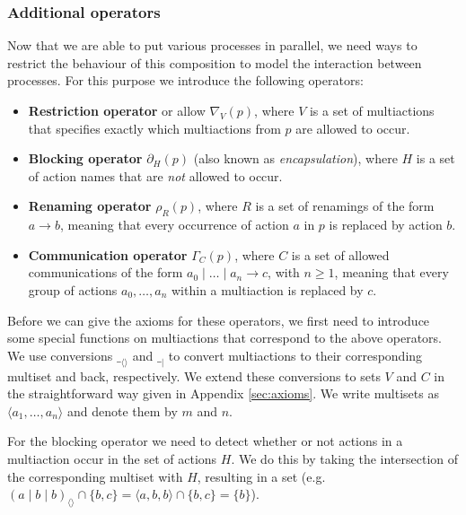 \documentclass[a4paper,fleqn]{article}
\newcommand{\set}[1]{\ensuremath{\{\,#1\,\}}}
\newcommand{\bag}[1]{\ensuremath{\set{#1}}}
\newcommand{\deffont}[1]{\textbf{#1}}
\newcommand{\sync}{\mathbin{\!\mid\!}}
\newcommand{\block}[1]{\partial_{#1}}
\newcommand{\ren}[1]{\rho_{#1}}
\newcommand{\allow}[1]{\nabla_{#1}}
\newcommand{\comm}[1]{\Gamma_{#1}}
\def\tobag#1{#1_{\langle\rangle}}
\def\tomact#1{#1_{\mid}}
\def\bag#1{\langle #1 \rangle}
\begin{document}
\subsubsection{Additional operators}
\label{sssec:additional operators}

Now that we are able to put various processes in parallel, we need ways to
restrict the behaviour of this composition to model the interaction between
processes. For this purpose we introduce the following operators:

\begin{itemize}
\item \deffont{Restriction operator} or allow $\allow{V}(p)$, where $V$
is a set of multiactions that specifies exactly which multiactions from $p$ are
allowed to occur. 

\item \deffont{Blocking operator} $\block{H}(p)$ (also known as {\it
encapsulation}), where $H$ is a set of action names that are {\it not} allowed
to occur.

\item \deffont{Renaming operator} $\ren{R}(p)$, where $R$ is a set of renamings
of the form $a\to b$, meaning that every occurrence of action $a$ in $p$ is
replaced by action $b$.

\item \deffont{Communication operator} $\comm{C}(p)$, where $C$ is a set of
allowed communications of the form $a_0\mid\ldots\mid a_n \to c$, with $n\ge
1$, meaning that every group of actions $a_0,\ldots,a_n$ within a multiaction
is replaced by $c$.

\end{itemize}

\noindent
Before we can give the axioms for these operators, we first need to introduce
some special functions on multiactions that correspond to the above operators.
We use conversions $\tobag{\_}$ and $\tomact{\_}$ to convert multiactions to
their corresponding multiset and back, respectively. We extend these
conversions to sets $V$ and $C$ in the straightforward way given in Appendix
\ref{sec:axioms}. We write multisets as $\bag{a_1,\ldots,a_n}$ and denote them by $m$ and $n$.

For the blocking operator we need to detect whether or not actions in a
multiaction occur in the set of actions $H$. We do this by taking the
intersection of the corresponding multiset with $H$, resulting in a set
(e.g. $\tobag{(a\sync b\sync b)}\cap\{b,c\} = \bag{a,b,b} \cap\{b,c\} =
\{b\}$).
\end{document}
